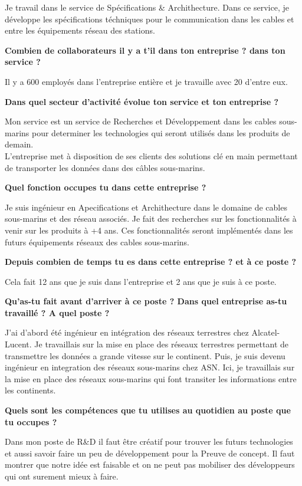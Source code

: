 \documentclass{article}
\newcommand{\question}[1]{\medskip\noindent\textbf{#1}\medskip}
\begin{document}
    Je travail dans le service de Spécifications \& Archithecture.
    Dans ce service, je développe les spécifications téchniques pour le communication dans les cables et entre les équipements réseau des stations.

    \question{Combien de collaborateurs il y a t’il dans ton entreprise ? dans ton service ?}

    Il y a 600 employés dans l'entreprise entière et je travaille avec 20 d'entre eux.

    \question{Dans quel secteur d'activité évolue ton service et ton entreprise ?}

    Mon service est un service de Recherches et Développement dans les cables sous-marins pour determiner les technologies qui seront utilisés dans les produits de demain.\\
    L'entreprise met à disposition de ses clients des solutions clé en main permettant de transporter les données dans des câbles sous-marins.

    \question{Quel fonction occupes tu dans cette entreprise ?}

    Je suis ingénieur en Apecifications et Archithecture dans le domaine de cables sous-marins et des réseau associés.
    Je fait des recherches sur les fonctionnalités à venir sur les produits à +4 ans.
    Ces fonctionnalités seront implémentés dans les futurs équipements réseaux des cables sous-marins.

    \question{Depuis combien de temps tu es dans cette entreprise ? et à ce poste ?}

    Cela fait 12 ans que je suis dans l'entreprise et 2 ans que je suis à ce poste.

    \question{Qu'as-tu fait avant d'arriver à ce poste ? Dans quel entreprise as-tu travaillé ? A quel poste ?}

    J'ai d'abord été ingénieur en intégration des réseaux terrestres chez Alcatel-Lucent.
    Je travaillais sur la mise en place des réseaux terrestres permettant de transmettre les données a grande vitesse sur le continent.
    Puis, je suis devenu ingénieur en integration des réseaux sous-marins chez ASN.
    Ici, je travaillais sur la mise en place des réseaux sous-marins qui font transiter les informations entre les continents.

    \question{Quels sont les compétences que tu utilises au quotidien au poste que tu occupes ?}

    Dans mon poste de R\&D il faut être créatif pour trouver les futurs technologies et aussi savoir faire un peu de développement pour la Preuve de concept.
    Il faut montrer que notre idée est faisable et on ne peut pas mobiliser des développeurs qui ont surement mieux à faire.
\end{document}
